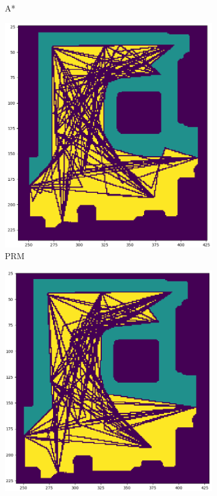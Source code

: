 \begin{figure}[h]
\begin{subfigure}{.25\textwidth}
      \caption{A*}
    \end{subfigure}%
    \begin{subfigure}{.25\textwidth}
      \centering
      \includegraphics[width=\textwidth]{figures/60_results/room2_disturbance_prm.png}
      \caption{PRM}
    \end{subfigure}%
    \begin{subfigure}{.25\textwidth}
      \centering
      \includegraphics[width=\textwidth]{figures/60_results/room2_disturbance_rrt.png}

\end{subfigure}
\end{figure}
